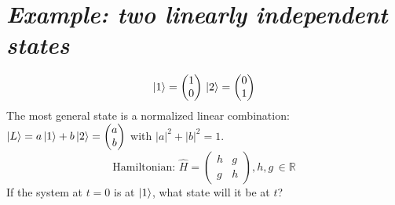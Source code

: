 \section{\textit{Example: two linearly independent states}}
\[\ket{1}=\begin{pmatrix}1\\0\end{pmatrix}\,\ket{2}=\begin{pmatrix}0\\1\end{pmatrix}\]
The most general state is a normalized linear combination: $\ket{L}=a\ket{1}+b\ket{2}=\begin{pmatrix}a\\b\end{pmatrix}$ with $|a|^2+|b|^2=1$.\\
\[\text{Hamiltonian: } \hat{H}=\begin{pmatrix}h&g\\g&h\end{pmatrix}, h,g\,\in \mathbb{R}\]
If the system at $t=0$ is at $\ket{1}$, what state will it be at $t$?
